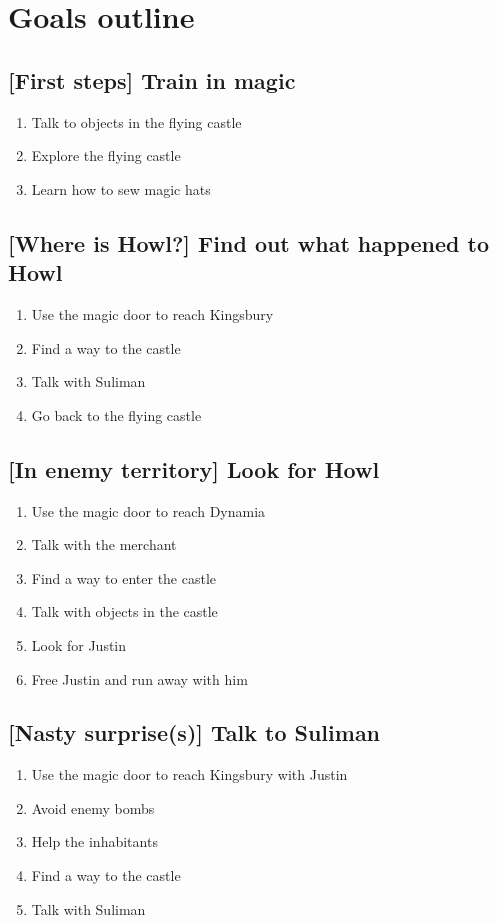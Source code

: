 \section{Goals outline}

\subsection{[First steps] Train in magic}
\begin{enumerate}
\item Talk to objects in the flying castle
\item Explore the flying castle
\item Learn how to sew magic hats
\end{enumerate}

\subsection{[Where is Howl?] Find out what happened to Howl}
\begin{enumerate}
\item Use the magic door to reach Kingsbury
\item Find a way to the castle
\item Talk with Suliman
\item Go back to the flying castle
\end{enumerate}

\subsection{[In enemy territory] Look for Howl}
\begin{enumerate}
\item Use the magic door to reach Dynamia
\item Talk with the merchant
\item Find a way to enter the castle
\item Talk with objects in the castle
\item Look for Justin
\item Free Justin and run away with him
\end{enumerate}

\subsection{[Nasty surprise(s)] Talk to Suliman}
\begin{enumerate}
\item Use the magic door to reach Kingsbury with Justin
\item Avoid enemy bombs
\item Help the inhabitants
\item Find a way to the castle
\item Talk with Suliman
\end{enumerate}

